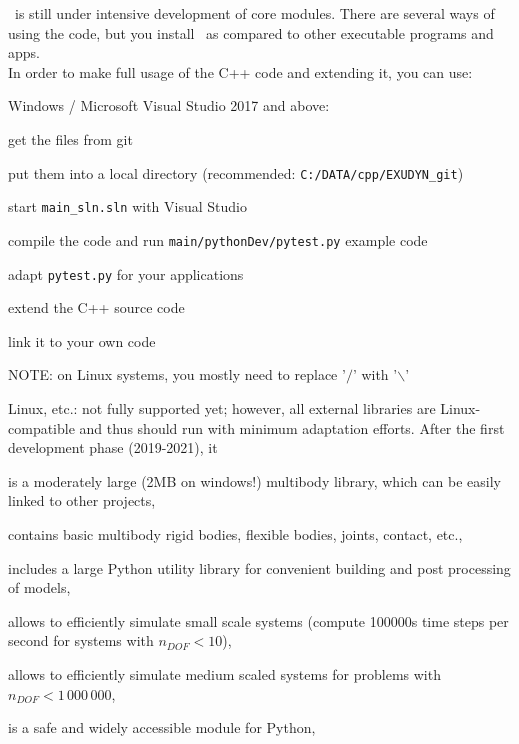 \codeName\ is still under intensive development of core modules.
There are several ways of using the code, but you  install \codeName\ as compared to other executable programs and apps.
\vspace{6pt}\\
In order to make full usage of the C++ code and extending it, you can use:
\bi
  \item Windows / Microsoft Visual Studio 2017 and above:
  \bi
    \item get the files from git
    \item put them into a local directory (recommended: \texttt{C:/DATA/cpp/EXUDYN\_git})
    \item start \texttt{main\_sln.sln} with Visual Studio
    \item compile the code and run \texttt{main/pythonDev/pytest.py} example code
    \item adapt \texttt{pytest.py} for your applications
    \item extend the C++ source code
    \item link it to your own code
    \item NOTE: on Linux systems, you mostly need to replace '$/$' with '$\backslash$'
  \ei
  \item Linux, etc.: not fully supported yet; however, all external libraries are Linux-compatible and thus should run with minimum adaptation efforts.
\ei
%
After the first development phase (2019-2021), it
\bi
  \item is a moderately large (2MB on windows!) multibody library, which can be easily linked to other projects,
  \item contains basic multibody rigid bodies, flexible bodies, joints, contact, etc.,
  \item includes a large Python utility library for convenient building and post processing of models,
  \item allows to efficiently simulate small scale systems (compute 100000s time steps per second for systems with $n_{DOF}<10$),
  \item allows to efficiently simulate medium scaled systems for problems with $n_{DOF} < 1\,000\,000$,
  \item is a safe and widely accessible module for Python,

